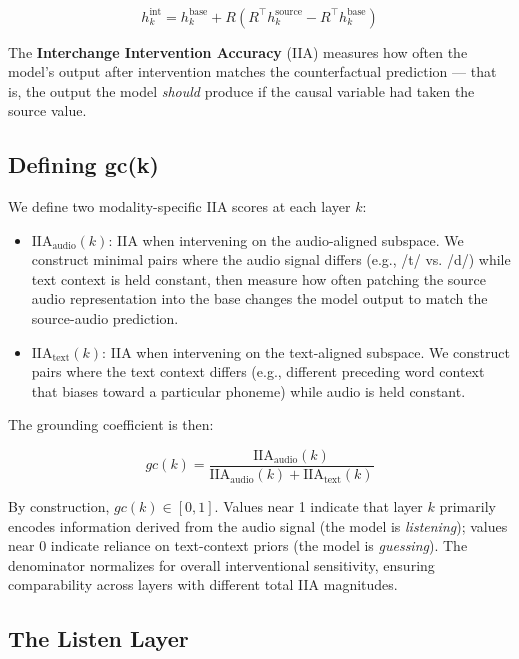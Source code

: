 \documentclass[a4paper]{article}
\begin{document}
\[h_k^{\text{int}} = h_k^{\text{base}} + R\left(R^\top h_k^{\text{source}} - R^\top h_k^{\text{base}}\right)\]

The \textbf{Interchange Intervention Accuracy} (IIA) measures how often the model's output after intervention matches the counterfactual prediction — that is, the output the model \textit{should} produce if the causal variable had taken the source value.

\subsection{Defining gc(k)}

We define two modality-specific IIA scores at each layer $k$:

\begin{itemize}
\item $\text{IIA}_{\text{audio}}(k)$: IIA when intervening on the audio-aligned subspace. We construct minimal pairs where the audio signal differs (e.g., /t/ vs. /d/) while text context is held constant, then measure how often patching the source audio representation into the base changes the model output to match the source-audio prediction.
\end{itemize}

\begin{itemize}
\item $\text{IIA}_{\text{text}}(k)$: IIA when intervening on the text-aligned subspace. We construct pairs where the text context differs (e.g., different preceding word context that biases toward a particular phoneme) while audio is held constant.
\end{itemize}

The grounding coefficient is then:

\[gc(k) = \frac{\text{IIA}_{\text{audio}}(k)}{\text{IIA}_{\text{audio}}(k) + \text{IIA}_{\text{text}}(k)}\]

By construction, $gc(k) \in [0, 1]$. Values near 1 indicate that layer $k$ primarily encodes information derived from the audio signal (the model is \textit{listening}); values near 0 indicate reliance on text-context priors (the model is \textit{guessing}). The denominator normalizes for overall interventional sensitivity, ensuring comparability across layers with different total IIA magnitudes.

\subsection{The Listen Layer}
\end{document}
